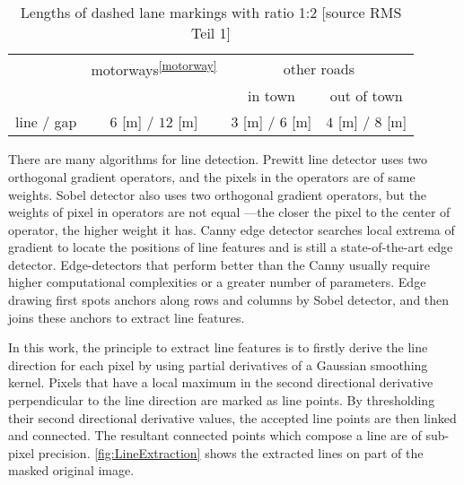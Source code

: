\setlength{\floatsep}{16pt plus 1.0pt minus 2.0pt}
\begin{table} [h!]
	\centering
	\begin{tabular}{l|ccc}
		\toprule
		& motorways\textsuperscript{\ref{motorway}} & \multicolumn{2}{c}{other roads}\\
		\cline{3-4}
		&           & in town & out of town\\
		\midrule
		line / gap  & $6$ [m] / $12$ [m] & $3$ [m] / $6$ [m] & $4$ [m] / $8$ [m]\\
		\bottomrule
	\end{tabular}
	\caption{\small Lengths of dashed lane markings with ratio 1:2 [source RMS Teil 1]}
	\label{tab:DashedLaneMarkingLengths}
\end{table}


\clearpage

There are many algorithms for line detection. %
Prewitt line detector uses two orthogonal gradient operators, and the pixels in the operators are of same weights. Sobel detector also uses two orthogonal gradient operators, but the weights of pixel in operators are not equal ---the closer the pixel to the center of operator, the higher weight it has. Canny edge detector searches local extrema of gradient to locate the positions of line features and is still a state-of-the-art edge detector. Edge-detectors that perform better than the Canny usually require higher computational complexities or a greater number of parameters. Edge drawing \cite{Topal2012} first spots anchors along rows and columns by Sobel detector, and then joins these anchors to extract line features.

In this work, the principle to extract line features is to firstly derive the line direction for each pixel by using partial derivatives of a Gaussian smoothing kernel. Pixels that have a local maximum in the second directional derivative perpendicular to the line direction are marked as line points. By thresholding their second directional derivative values, the accepted line points are then linked and connected.
The resultant connected points which compose a line are of sub-pixel precision. \cref{fig:LineExtraction} shows the extracted lines on part of the masked original image.

